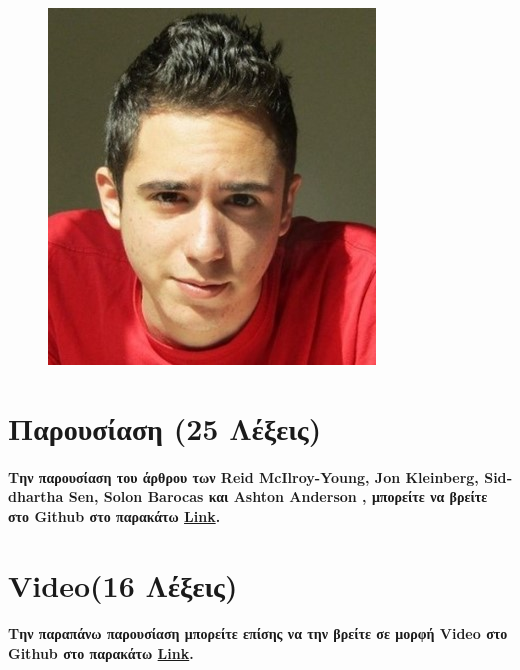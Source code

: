 \documentclass[12pt, A4]{article}
\newcommand{\tl}{\textlatin}
\begin{document}
    \begin{figure}
	\includegraphics[width=\linewidth]{Bio/bio2.jpg}
    \end{figure}
    
    \newpage
    \section{Παρουσίαση (25 Λέξεις)}
    \paragraph{Την παρουσίαση του άρθρου των \tl{Reid McIlroy-Young, Jon Kleinberg, Siddhartha Sen, Solon Barocas} και \tl{Ashton Anderson} \cite{article3}, μπορείτε να βρείτε στο \tl{Github} στο παρακάτω \href{https://github.com/CallMeJasonYT/Ethics-Project/blob/main/Angoura_Pavlopoulos_Ethics.pptx}{\tl{Link}}.}
    
    \section{\tl{Video}(16 Λέξεις)}
    \paragraph{Την παραπάνω παρουσίαση μπορείτε επίσης να την βρείτε σε μορφή \tl{Video} στο \tl{Github} στο παρακάτω \href{https://github.com/CallMeJasonYT/Ethics-Project/blob/main/Angoura_Pavlopoulos_Ethics.mp4}{\tl{Link}}.}
    
\end{document}
